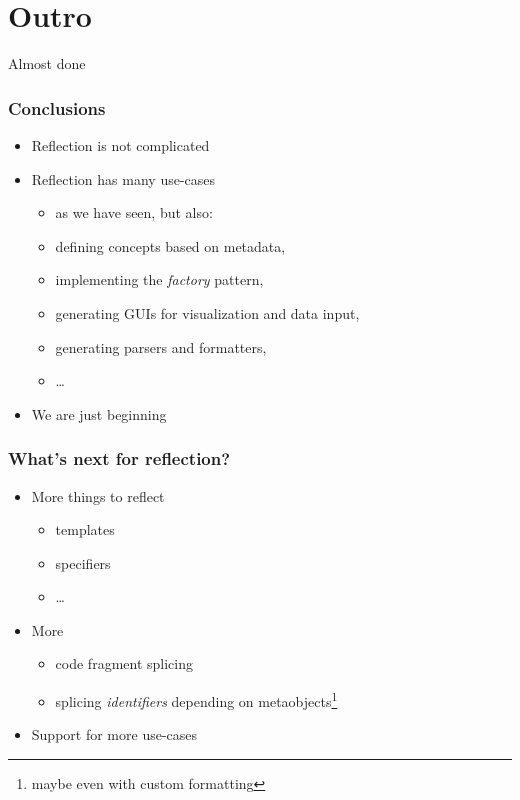 \documentclass[compress,table,xcolor=table]{beamer}
\begin{document}
\section{Outro}
\begin{frame}[c]
  \Huge
  \centering
  Almost done
\end{frame}
\begin{frame}
  \frametitle{Conclusions}
  \Large
  \begin{itemize}
    \item Reflection is not complicated
    \item Reflection has many use-cases
    \begin{itemize}
      \smaller
      \item as we have seen, but also:
      \item defining concepts based on metadata,
      \item implementing the {\em factory} pattern,
      \item generating GUIs for visualization and data input,
      \item generating  parsers and formatters,
      \item \ldots
    \end{itemize}
    \item We are just beginning
  \end{itemize}
\end{frame}
\begin{frame}
  \frametitle{What's next for reflection?}
  \Large
  \begin{itemize}
    \item More things to reflect
    \begin{itemize}
      \smaller
      \item templates
      \item specifiers
      \item \ldots
    \end{itemize}
    \item More 
    \begin{itemize}
      \smaller
      \item code fragment splicing
      \item splicing {\em \larger identifiers} depending on metaobjects\footnote{
          maybe even with custom formatting}
    \end{itemize}
    \item Support for more use-cases
  \end{itemize}
\end{frame}
\end{document}
